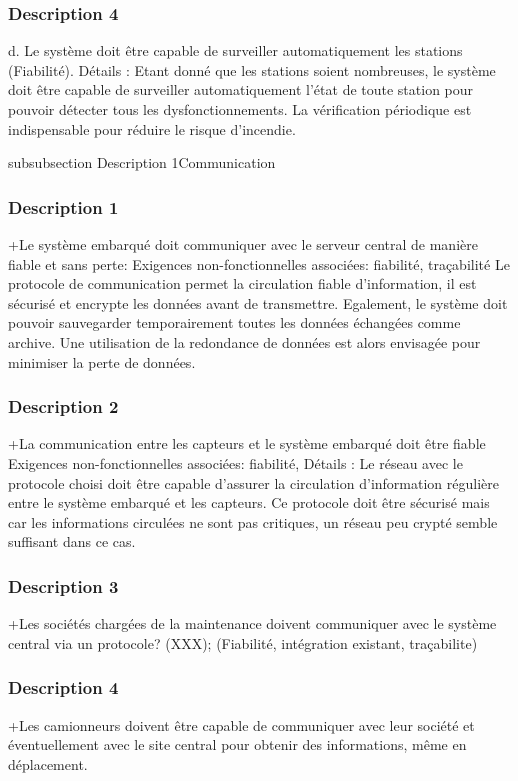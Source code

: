 \subsubsection {Description 4}
d. Le système doit être capable de surveiller automatiquement les stations (Fiabilité).
Détails : Etant donné que les stations soient nombreuses, le système doit être capable de surveiller automatiquement  l’état de toute station pour pouvoir détecter tous les dysfonctionnements.  La vérification périodique est indispensable pour réduire le risque d’incendie.  

subsubsection {Description 1}Communication
\subsubsection {Description 1}
+Le système embarqué doit communiquer avec le serveur central de manière fiable et sans perte:
Exigences non-fonctionnelles associées: fiabilité, traçabilité 
Le protocole de communication permet la circulation fiable d’information, il est sécurisé et encrypte les données avant de transmettre. Egalement, le système doit pouvoir sauvegarder temporairement toutes les données échangées comme archive. Une utilisation de la redondance de données est alors envisagée pour minimiser la perte de données.

\subsubsection {Description 2}
+La communication entre les capteurs et le système embarqué doit être fiable 
Exigences non-fonctionnelles associées: fiabilité, 
Détails : Le réseau avec le protocole choisi doit être capable d’assurer la circulation d’information régulière entre le système embarqué et les capteurs. Ce protocole doit être sécurisé mais car les informations circulées ne sont pas critiques, un réseau peu crypté semble suffisant dans ce cas.

\subsubsection {Description 3}
+Les sociétés chargées de la maintenance doivent communiquer avec le système central via un protocole? (XXX); (Fiabilité, intégration existant, traçabilite)

\subsubsection {Description 4}
+Les camionneurs doivent être capable de communiquer avec leur société et éventuellement avec le site central pour obtenir des informations, même en déplacement.


